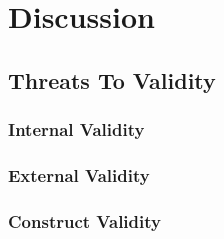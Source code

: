 
\chapter{Discussion}

\section{Threats To Validity}
\label{sub:threats_to_validity}

\subsection{Internal Validity}
\label{sub:internal_validty}

\subsection{External Validity}
\label{sub:external_validity}

\subsection{Construct Validity} %
\label{sub:construct_validity}

